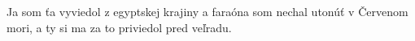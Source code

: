 Ja som ťa vyviedol z egyptskej krajiny
a faraóna som nechal utonúť v Červenom mori,
a ty si ma za to priviedol pred veľradu.